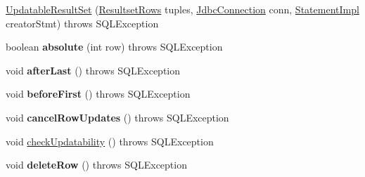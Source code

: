 \begin{DoxyCompactItemize}
\item 
\mbox{\hyperlink{classcom_1_1mysql_1_1cj_1_1jdbc_1_1result_1_1_updatable_result_set_a1518489c8c8ca80e7c0759ce169e9477}{Updatable\+Result\+Set}} (\mbox{\hyperlink{interfacecom_1_1mysql_1_1cj_1_1protocol_1_1_resultset_rows}{Resultset\+Rows}} tuples, \mbox{\hyperlink{interfacecom_1_1mysql_1_1cj_1_1jdbc_1_1_jdbc_connection}{Jdbc\+Connection}} conn, \mbox{\hyperlink{classcom_1_1mysql_1_1cj_1_1jdbc_1_1_statement_impl}{Statement\+Impl}} creator\+Stmt)  throws S\+Q\+L\+Exception 
\item 
\mbox{\label{classcom_1_1mysql_1_1cj_1_1jdbc_1_1result_1_1_updatable_result_set_a06740318948c45ed6e3309512e0375f3}} 
boolean {\bfseries absolute} (int row)  throws S\+Q\+L\+Exception 
\item 
\mbox{\label{classcom_1_1mysql_1_1cj_1_1jdbc_1_1result_1_1_updatable_result_set_a3de87ab69d95977efa3a012d111bd457}} 
void {\bfseries after\+Last} ()  throws S\+Q\+L\+Exception 
\item 
\mbox{\label{classcom_1_1mysql_1_1cj_1_1jdbc_1_1result_1_1_updatable_result_set_aa282db4f85231cebd7b2d44e8d31251d}} 
void {\bfseries before\+First} ()  throws S\+Q\+L\+Exception 
\item 
\mbox{\label{classcom_1_1mysql_1_1cj_1_1jdbc_1_1result_1_1_updatable_result_set_a46dea298e2bb408523b0670528d5fdcb}} 
void {\bfseries cancel\+Row\+Updates} ()  throws S\+Q\+L\+Exception 
\item 
void \mbox{\hyperlink{classcom_1_1mysql_1_1cj_1_1jdbc_1_1result_1_1_updatable_result_set_a1bff404358892353e1108104b2f79084}{check\+Updatability}} ()  throws S\+Q\+L\+Exception 
\item 
\mbox{\label{classcom_1_1mysql_1_1cj_1_1jdbc_1_1result_1_1_updatable_result_set_a8ec92a7de30ca3a13223c75a482a99c2}} 
void {\bfseries delete\+Row} ()  throws S\+Q\+L\+Exception 
\item 
\mbox{\label{classcom_1_1mysql_1_1cj_1_1jdbc_1_1result_1_1_updatable_result_set_a2d4171e3aab85ff02d7e1be70ac3e7fc}} 

\end{DoxyCompactItemize}
